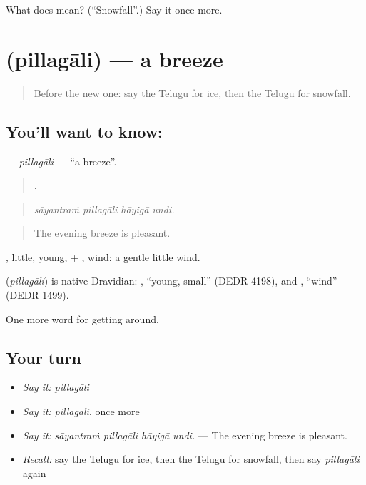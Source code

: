 \begin{tcolorbox}[breakable,colback=teal!4,colframe=teal!35!black,title={Before you move on}]
What does  mean? (\textquotedblleft{}Snowfall\textquotedblright{}.) Say it once more.
\end{tcolorbox}
\section[\texorpdfstring{\te{పిల్లగాలి} (pillagāli)}{పిల్లగాలి (pillagāli)}]{ (pillagāli) — a breeze}

\label{lesson:TE-C482-pillagali}



\begin{quote}
Before the new one: say the Telugu for ice, then the Telugu for snowfall.
\end{quote}

\subsection*{You'll want to know: }
\textbf{} — \emph{pillagāli} — \textquotedblleft{}a breeze\textquotedblright{}.

\begin{quote}
   .
\end{quote}

\begin{quote}
\emph{sāyantraṁ pillagāli hāyigā undi.}
\end{quote}

\begin{quote}
The evening breeze is pleasant.
\end{quote}

, little, young, + , wind: a gentle little wind.

\begin{cousinweb}
\textbf{} (\emph{pillagāli}) is native Dravidian: , \textquotedblleft{}young, small\textquotedblright{} (DEDR 4198), and , \textquotedblleft{}wind\textquotedblright{} (DEDR 1499).
\end{cousinweb}

\begin{grammarlens}[title={What you've built}]
One more word for getting around.
\end{grammarlens}

\subsection*{Your turn}
\begin{itemize}
\raggedright
  \item \emph{Say it:} \emph{pillagāli}
  \item \emph{Say it:} \emph{pillagāli}, once more
  \item \emph{Say it:} \emph{sāyantraṁ pillagāli hāyigā undi.} — The evening breeze is pleasant.
  \item \emph{Recall:} say the Telugu for ice, then the Telugu for snowfall, then say \emph{pillagāli} again
\end{itemize}

